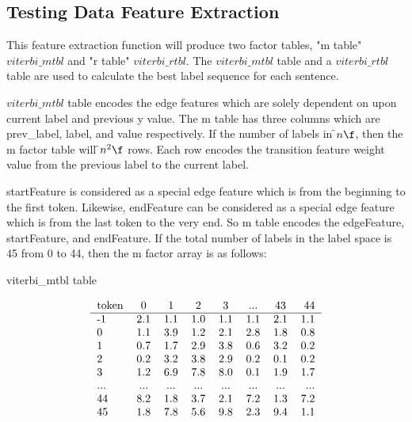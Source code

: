 \subsection{Testing Data Feature Extraction}
  This feature extraction function will produce two factor tables, "m table"
  $viterbi\_mtbl$ and "r table" $viterbi\_rtbl$. The $viterbi\_mtbl$
  table and a $viterbi\_rtbl$ table are used to calculate the best label
  sequence for each sentence.
 
  $viterbi\_mtbl$ table
  encodes the edge features which are solely dependent on upon current label and
  previous y value. The m table has three columns which are prev\_label, label,
  and value respectively.
  If the number of labels in \f$ n \f$, then the m factor table will \f$ n^2 \f$
  rows. Each row encodes the transition feature weight value from the previous label
  to the current label.
 
  startFeature is considered as a special edge feature which is from the
  beginning to the first token. Likewise, endFeature can be considered
  as a special edge feature which is from the last token to the very end.
  So m table encodes the edgeFeature, startFeature, and endFeature.
  If the total number of labels in the label space is 45 from 0 to 44,
  then the m factor array is as follows:
\begin {table}
\caption {viterbi\_mtbl table} \label{tab:title} 
 
  \[\begin{tabular}{l*{6}{c}r}
   token             & 0   & 1   & 2   & 3   & ... & 43 &  44 \\
   \hline
  -1                 & 2.1 & 1.1 & 1.0 & 1.1 & 1.1 & 2.1 & 1.1  \\
   0                 & 1.1 & 3.9 & 1.2 & 2.1 & 2.8 & 1.8 & 0.8  \\
   1                 & 0.7 & 1.7 & 2.9 & 3.8 & 0.6 & 3.2 & 0.2  \\
   2                 & 0.2 & 3.2 & 3.8 & 2.9 & 0.2 & 0.1 & 0.2  \\
   3                 & 1.2 & 6.9 & 7.8 & 8.0 & 0.1 & 1.9 & 1.7  \\
   ...               & ... & ... & ... & ... & ... & ... & ...  \\
   44                & 8.2 & 1.8 & 3.7 & 2.1 & 7.2 & 1.3 & 7.2  \\
   45                & 1.8 & 7.8 & 5.6 & 9.8 & 2.3 & 9.4 & 1.1  \\
  \end{tabular}\]
\end{table}
 
